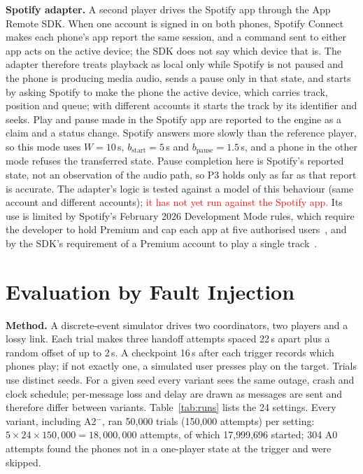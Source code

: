 \documentclass[conference]{IEEEtran}
\newcommand{\draftnote}[1]{\textcolor{red}{#1}}
\begin{document}
\textbf{Spotify adapter.} A second player drives the Spotify app through the App Remote SDK. When one account is signed in on both phones, Spotify Connect makes each phone's app report the same session, and a command sent to either app acts on the active device; the SDK does not say which device that is. The adapter therefore treats playback as local only while Spotify is not paused and the phone is producing media audio, sends a pause only in that state, and starts by asking Spotify to make the phone the active device, which carries track, position and queue; with different accounts it starts the track by its identifier and seeks. Play and pause made in the Spotify app are reported to the engine as a claim and a status change. Spotify answers more slowly than the reference player, so this mode uses $W=10$\,s, $b_{\mathrm{start}}=5$\,s and $b_{\mathrm{pause}}=1.5$\,s, and a phone in the other mode refuses the transferred state. Pause completion here is Spotify's reported state, not an observation of the audio path, so P3 holds only as far as that report is accurate. The adapter's logic is tested against a model of this behaviour (same account and different accounts); \draftnote{it has not yet run against the Spotify app.} Its use is limited by Spotify's February 2026 Development Mode rules, which require the developer to hold Premium and cap each app at five authorised users~\cite{spotify2026}, and by the SDK's requirement of a Premium account to play a single track~\cite{spotifysdk}.

\section{Evaluation by Fault Injection}\label{sec:faulteval}

\textbf{Method.} A discrete-event simulator drives two coordinators, two players and a lossy link. Each trial makes three handoff attempts spaced 22\,s apart plus a random offset of up to 2\,s. A checkpoint 16\,s after each trigger records which phones play; if not exactly one, a simulated user presses play on the target. Trials use distinct seeds. For a given seed every variant sees the same outage, crash and clock schedule; per-message loss and delay are drawn as messages are sent and therefore differ between variants. Table~\ref{tab:runs} lists the 24 settings. Every variant, including A2$^-$, ran 50{,}000 trials (150{,}000 attempts) per setting: $5 \times 24 \times 150{,}000 = 18{,}000{,}000$ attempts, of which 17{,}999{,}696 started; 304 A0 attempts found the phones not in a one-player state at the trigger and were skipped.
\end{document}
